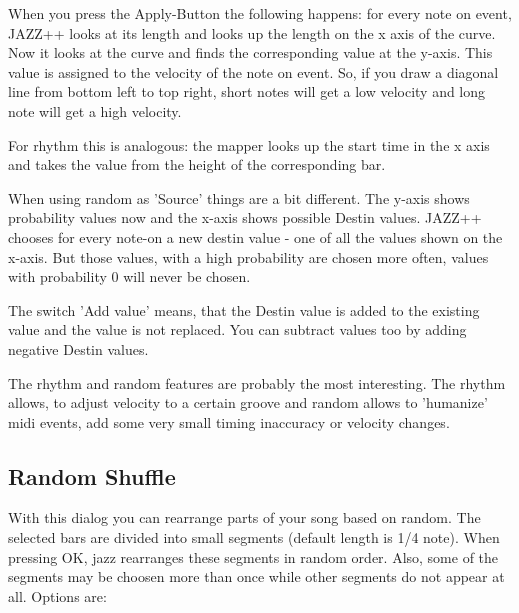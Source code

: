 \documentclass[letterpaper]{report}
\begin{document}
When you press the Apply-Button
the following happens: for every note on event, JAZZ++ looks at its length and
looks up the length on the x axis of the curve. Now it looks at the curve and
finds the corresponding value at the y-axis. This value is assigned to the
velocity of the note on event. So, if you draw a diagonal line from bottom
left to top right, short notes will get a low velocity and long note will get
a high velocity.

For rhythm this is analogous: the mapper looks up the start time in the x axis
and takes the value from the height of the corresponding bar.

When using random as 'Source' things are a bit different. The y-axis shows
probability values now and the x-axis shows possible Destin values.
JAZZ++ chooses for every note-on a new destin value - one of all the values
shown on the x-axis. But those values, with a high probability are chosen
more often, values with probability 0 will never be chosen.

The switch 'Add value' means, that the Destin value is added to the existing
value and the value is not replaced. You can subtract values too by adding
negative Destin values.

The rhythm and random features are probably the most interesting. The rhythm
allows, to adjust velocity to a certain groove and random allows to 'humanize'
midi events, add some very small timing inaccuracy or velocity changes.



\subsection{Random Shuffle}\label{shuffle}


With this dialog you can rearrange parts of your song based on random. The
selected bars are divided into small segments (default length is 1/4 note).
When pressing OK, jazz rearranges these segments in random order. Also,
some of the segments may be choosen more than once while other segments do
not appear at all. Options are:
\end{document}
